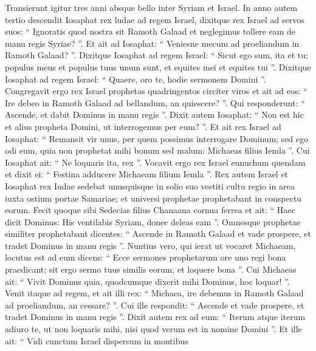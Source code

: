 \begin{biblechapter}
\begin{biblechapter}
\begin{biblechapter}
\begin{biblechapter}
\begin{biblechapter}
\begin{biblechapter}
\begin{biblechapter}
\begin{biblechapter}
\begin{biblechapter}
\begin{biblechapter}
\begin{biblechapter}
\begin{biblechapter}
\begin{biblechapter}
\begin{biblechapter}
\begin{biblechapter}
\begin{biblechapter}
\begin{biblechapter}
\begin{biblechapter}
\begin{biblechapter}
\begin{biblechapter}
\begin{biblechapter}
\begin{biblechapter}
\verse Transierunt igitur tres anni absque bello inter Syriam et Israel. 
\verse In anno autem tertio descendit Iosaphat rex ludae ad regem Israel, 
\verse dixitque rex Israel ad servos suos: “ Ignoratis quod nostra sit Ramoth Galaad et neglegimus tollere eam de manu regis Syriae? ”. 
\verse Et ait ad Iosaphat: “ Veniesne mecum ad proeliandum in Ramoth Galaad? ”.
 \verse Dixitque Iosaphat ad regem Israel: “ Sicut ego sum, ita et tu; populus meus et populus tuus unum sunt, et equites mei et equites tui ”. Dixitque Iosaphat ad regem Israel: “ Quaere, oro te, hodie sermonem Domini ”. 
\verse Congregavit ergo rex Israel prophetas quadringentos circiter viros et ait ad eos: “ Ire debeo in Ramoth Galaad ad bellandum, an quiescere? ”. Qui responderunt: “ Ascende, et dabit Dominus in manu regis ”. 
\verse Dixit autem Iosaphat: “ Non est hic et alius propheta Domini, ut interrogemus per eum? ”. 
\verse Et ait rex Israel ad Iosaphat: “ Remansit vir unus, per quem possimus interrogare Dominum; sed ego odi eum, quia non prophetat mihi bonum sed malum: Michaeas filius Iemla ”. Cui Iosaphat ait: “ Ne loquaris ita, rex ”. 
\verse Vocavit ergo rex Israel eunuchum quendam et dixit ei: “ Festina adducere Michaeam filium Iemla ”.
 \verse Rex autem Israel et Iosaphat rex Iudae sedebat unusquisque in solio suo vestiti cultu regio in area iuxta ostium portae Samariae; et universi prophetae prophetabant in conspectu eorum. 
\verse Fecit quoque sibi Sedecias filius Chanaana cornua ferrea et ait: “ Haec dicit Dominus: His ventilabis Syriam, donec deleas eam ”. 
\verse Omnesque prophetae similiter prophetabant dicentes: “ Ascende in Ramoth Galaad et vade prospere, et tradet Dominus in manu regis ”.
 \verse Nuntius vero, qui ierat ut vocaret Michaeam, locutus est ad eum dicens: “ Ecce sermones prophetarum ore uno regi bona praedicant; sit ergo sermo tuus similis eorum, et loquere bona ”. 
\verse Cui Michaeas ait: “ Vivit Dominus quia, quodcumque dixerit mihi Dominus, hoc loquar! ”.
 \verse Venit itaque ad regem, et ait illi rex: “ Michaea, ire debemus in Ramoth Galaad ad proeliandum, an cessare? ”. Cui ille respondit: “ Ascende et vade prospere, et tradet Dominus in manu regis ”. 
\verse Dixit autem rex ad eum: “ Iterum atque iterum adiuro te, ut non loquaris mihi, nisi quod verum est in nomine Domini ”. 
\verse Et ille ait:
 “ Vidi cunctum Israel
 dispersum in montibus

\end{biblechapter}
\end{biblechapter}
\end{biblechapter}
\end{biblechapter}
\end{biblechapter}
\end{biblechapter}
\end{biblechapter}
\end{biblechapter}
\end{biblechapter}
\end{biblechapter}
\end{biblechapter}
\end{biblechapter}
\end{biblechapter}
\end{biblechapter}
\end{biblechapter}
\end{biblechapter}
\end{biblechapter}
\end{biblechapter}
\end{biblechapter}
\end{biblechapter}
\end{biblechapter}
\end{biblechapter}
